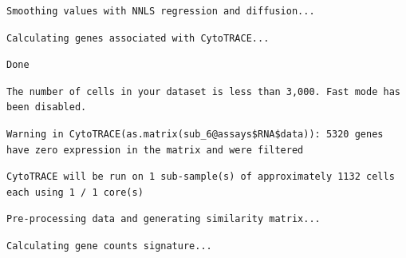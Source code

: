 \documentclass[
  landscape]{article}
\newenvironment{Shaded}{\begin{snugshade}}{\end{snugshade}}
\newcommand{\DecValTok}[1]{\textcolor[rgb]{0.00,0.00,0.81}{#1}}
\newcommand{\FunctionTok}[1]{\textcolor[rgb]{0.13,0.29,0.53}{\textbf{#1}}}
\newcommand{\NormalTok}[1]{#1}
\newcommand{\OtherTok}[1]{\textcolor[rgb]{0.56,0.35,0.01}{#1}}
\newcommand{\SpecialCharTok}[1]{\textcolor[rgb]{0.81,0.36,0.00}{\textbf{#1}}}
\newcommand{\StringTok}[1]{\textcolor[rgb]{0.31,0.60,0.02}{#1}}
\begin{document}
\begin{verbatim}
Smoothing values with NNLS regression and diffusion...
\end{verbatim}

\begin{verbatim}
Calculating genes associated with CytoTRACE...
\end{verbatim}

\begin{verbatim}
Done
\end{verbatim}

\begin{Shaded}
\end{Shaded}

\begin{verbatim}
The number of cells in your dataset is less than 3,000. Fast mode has been disabled.
\end{verbatim}

\begin{verbatim}
Warning in CytoTRACE(as.matrix(sub_6@assays$RNA$data)): 5320 genes have zero expression in the matrix and were filtered
\end{verbatim}

\begin{verbatim}
CytoTRACE will be run on 1 sub-sample(s) of approximately 1132 cells each using 1 / 1 core(s)
\end{verbatim}

\begin{verbatim}
Pre-processing data and generating similarity matrix...
\end{verbatim}

\begin{verbatim}
Calculating gene counts signature...
\end{verbatim}
\end{document}

